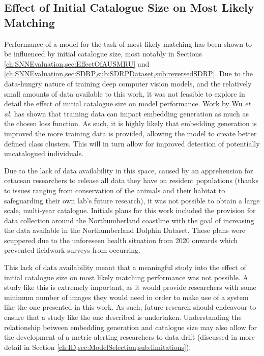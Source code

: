 \subsection{Effect of Initial Catalogue Size on Most Likely Matching}\label{ch:Conclusion,sec:FutureWork,sub:EffectOfCatalogueSize}

Performance of a model for the task of most likely matching has been shown to be influenced by initial catalogue size, most notably in Sections \ref{ch:SNNEvaluation,sec:EffectOfAUSMRU} and \ref{ch:SNNEvaluation,sec:SDRP,sub:SDRPDataset,sub:reversedSDRP}. Due to the data-hungry nature of training deep computer vision models, and the relatively small amounts of data available to this work, it was not feasible to explore in detail the effect of initial catalogue size on model performance. Work by Wu \textit{et al.} \cite{wu_sampling_2017} has shown that training data can impact embedding generation as much as the chosen loss function. As such, it is highly likely that embedding generation is improved the more training data is provided, allowing the model to create better defined class clusters. This will in turn allow for improved detection of potentially uncatalogued individuals. 

Due to the lack of data availability in this space, caused by an apprehension for cetacean researchers to release all data they have on resident populations (thanks to issues ranging from conservation of the animals and their habitat to safeguarding their own lab's future research), it was not possible to obtain a large scale, multi-year catalogue. Initials plans for this work included the provision for data collection around the Northumberland coastline with the goal of increasing the data available in the Northumberland Dolphin Dataset. These plans were scuppered due to the unforeseen health situation from 2020 onwards which prevented fieldwork surveys from occurring. 

This lack of data availability meant that a meaningful study into the effect of initial catalogue size on most likely matching performance was not possible. A study like this is extremely important, as it would provide researchers with some minimum number of images they would need in order to make use of a system like the one presented in this work. As such, future research should endeavour to ensure that a study like the one described is undertaken. Understanding the relationship between embedding generation and catalogue size may also allow for the development of a metric alerting researchers to data drift (discussed in more detail in Section \ref{ch:ID,sec:ModelSelection,sub:limitations}).

